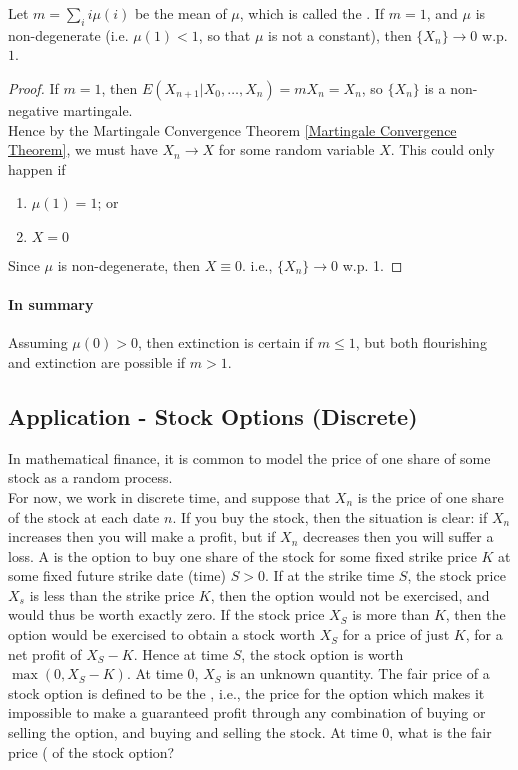 \documentclass[11pt]{article}
\begin{document}
   	\theorem  Let $m = \sum_{i}i\mu(i)$ be the mean of $\mu$, which is called the . If $m = 1$, and $\mu$ is non-degenerate (i.e. $\mu(1) < 1$, so that $\mu$ is not a constant), then $\{X_n\} \rightarrow 0$ w.p. $1$.
   	\begin{proof}
   		If $m=1$, then $E(X_{n+1}|X_0, \hdots, X_n) = mX_n = X_n$, so $\{X_n\}$ is a non-negative martingale.\\
   		Hence by the Martingale Convergence Theorem \ref{Martingale Convergence Theorem}, we must have $X_n \rightarrow X$ for some random variable $X$. This could only happen if
   		\begin{enumerate}
   			\item $\mu(1) = 1$; or
   			\item $X = 0$
   		\end{enumerate}
   		Since $\mu$ is non-degenerate, then $X \equiv 0$. i.e., $\{X_n\} \rightarrow 0$ w.p. 1.
   	\end{proof}
   	\paragraph{In summary}
   	Assuming $\mu(0) > 0$, then extinction is certain if $m \leq 1$, but both flourishing and extinction are possible if $m > 1$.
   	
   	
   	\subsection{Application - Stock Options (Discrete)}
   	In mathematical finance, it is common to model the price of one share of some stock as a random process.\\
   	For now, we work in discrete time, and suppose that $X_n$ is the price of one share of the stock at each date $n$. If you buy the stock, then the situation is clear: if $X_n$ increases then you will make a profit, but if $X_n$ decreases then you will suffer a loss.
   	A  is the option to buy one share of the stock for some fixed strike price $K$ at some fixed future strike date (time) $S > 0$. If at the strike time $S$, the stock price $X_s$ is less than the strike price $K$, then the option would not be exercised, and would thus be worth exactly zero. If the stock price $X_S$ is more than $K$, then the option would be exercised to obtain a stock worth $X_S$ for a price of just $K$, for a net profit of $X_S - K$. Hence at time $S$, the stock option is worth $\max(0, X_S - K)$.
   	\remark
   	At time 0, $X_S$ is an unknown quantity. The fair price of a stock option is defined to be the , i.e., the price for the option which makes it impossible to make a guaranteed profit through any combination of buying or selling the option, and buying and selling the stock.
   	At time 0, what is the fair price ( of the stock option?
   	
\end{document}
